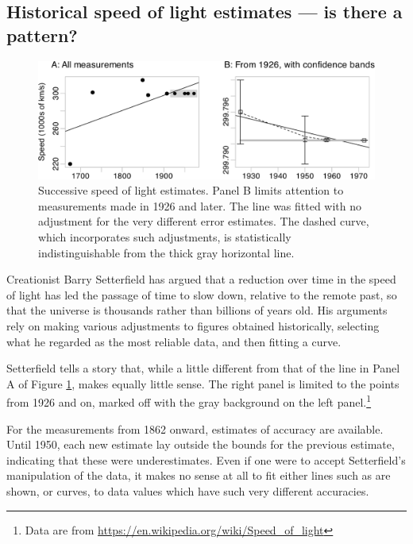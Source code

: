 \documentclass[
  10pt,
  b5paper]{book}
\begin{document}
\hypertarget{historical-speed-of-light-estimates-is-there-a-pattern}{%
\subsection*{Historical speed of light estimates --- is there a pattern?}\label{historical-speed-of-light-estimates-is-there-a-pattern}}

\begin{figure}[H]

{\centering \includegraphics{08-observational_files/figure-latex/plot-c-data-1} 

}

\caption{Successive speed of light estimates.  Panel B 
limits attention to measurements made in 1926 and later. 
The line was fitted with no adjustment for the very
different error estimates.  The dashed curve, which 
incorporates such adjustments, is statistically 
indistinguishable from the thick gray horizontal line.}\label{fig:plot-c-data}
\end{figure}

Creationist Barry Setterfield has argued that a reduction over
time in the speed of light has led the passage of time to slow
down, relative to the remote past, so that the universe is
thousands rather than billions of years old. His arguments rely
on making various adjustments to figures obtained historically,
selecting what he regarded as the most reliable data, and
then fitting a curve.

Setterfield tells a story that, while a little different from that of
the line in Panel A of Figure \ref{fig:plot-c-data}, makes equally
little sense. The right panel is limited to the points from 1926
and on, marked off with the gray background on the left panel.\footnote{Data
  are from \url{https://en.wikipedia.org/wiki/Speed_of_light}}

For the measurements from 1862 onward, estimates of accuracy
are available. Until 1950, each new estimate lay outside the
bounds for the previous estimate, indicating that these
were underestimates.
Even if one were to accept Setterfield's manipulation of the data,
it makes no sense at all to fit either lines such as are shown, or
curves, to data values which have such very different
accuracies.
\end{document}
